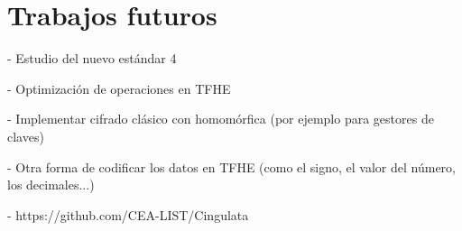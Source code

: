 \chapter{Trabajos futuros}
\label{chap:trabajos_futuros}

- Estudio del nuevo estándar 4

- Optimización de operaciones en TFHE

- Implementar cifrado clásico con homomórfica (por ejemplo para gestores de claves)

- Otra forma de codificar los datos en TFHE (como el signo, el valor del número, los decimales...)

- https://github.com/CEA-LIST/Cingulata
